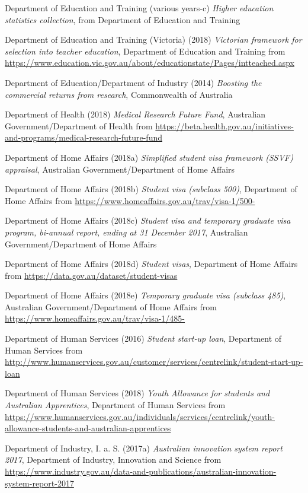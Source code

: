 \documentclass[]{book}
\begin{document}
\protect\hypertarget{_ENREF_90}{}{}Department of Education and Training (various years-c) \emph{Higher education statistics collection}, from Department of Education and Training

Department of Education and Training (Victoria) (2018) \emph{Victorian framework for selection into teacher education}, Department of Education and Training from \url{https://www.education.vic.gov.au/about/educationstate/Pages/intteached.aspx}

Department of Education/Department of Industry (2014) \emph{Boosting the commercial returns from research}, Commonwealth of Australia

Department of Health (2018) \emph{Medical Research Future Fund}, Australian Government/Department of Health from \url{https://beta.health.gov.au/initiatives-and-programs/medical-research-future-fund}

Department of Home Affairs (2018a) \emph{Simplified student visa framework (SSVF) appraisal}, Australian Government/Department of Home Affairs

Department of Home Affairs (2018b) \emph{Student visa (subclass 500)}, Department of Home Affairs from \url{https://www.homeaffairs.gov.au/trav/visa-1/500-}

Department of Home Affairs (2018c) \emph{Student visa and temporary graduate visa program, bi-annual report, ending at 31 December 2017}, Australian Government/Department of Home Affairs

Department of Home Affairs (2018d) \emph{Student visas}, Department of Home Affairs from \url{https://data.gov.au/dataset/student-visas}

Department of Home Affairs (2018e) \emph{Temporary graduate visa (subclass 485)}, Australian Government/Department of Home Affairs from \url{https://www.homeaffairs.gov.au/trav/visa-1/485-}

Department of Human Services (2016) \emph{Student start-up loan}, Department of Human Services from \url{http://www.humanservices.gov.au/customer/services/centrelink/student-start-up-loan}

Department of Human Services (2018) \emph{Youth Allowance for students and Australian Apprentices}, Department of Human Services from \url{https://www.humanservices.gov.au/individuals/services/centrelink/youth-allowance-students-and-australian-apprentices}

Department of Industry, I. a. S. (2017a) \emph{Australian innovation system report 2017}, Department of Industry, Innovation and Science from \url{https://www.industry.gov.au/data-and-publications/australian-innovation-system-report-2017}
\end{document}
